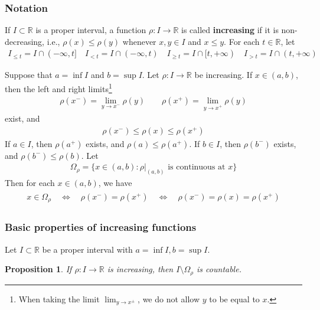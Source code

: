 \documentclass[12pt,b5paper,notitlepage]{article}
\theoremstyle{definition}
\theoremstyle{plain}
\newtheorem{pp}[df]{Proposition}
\newcommand{\Rbb}{\mathbb R}
\numberwithin{equation}{section}
\begin{document}
\subsubsection{Notation}\label{lb89}

If $I\subset\Rbb$ is a proper interval, a function $\rho:I\rightarrow\Rbb$ is called \textbf{increasing} if it is non-decreasing, i.e., $\rho(x)\leq \rho(y)$ whenever $x,y\in I$ and $x\leq y$. For each $t\in\Rbb$, let
\begin{align*}
I_{\leq t}=I\cap (-\infty,t]\quad I_{<t}=I\cap (-\infty,t)\quad I_{\geq t}=I\cap [t,+\infty)\quad I_{>t}=I\cap (t,+\infty)
\end{align*}

Suppose that $a=\inf I$ and $b=\sup I$. Let $\rho:I\rightarrow \Rbb$ be increasing. If $x\in(a,b)$, then the left and right limits\footnote{When taking the limit $\lim_{y\rightarrow x^\pm}$, we do not allow $y$ to be equal to $x$.}
\begin{align}
\rho(x^-)=\lim_{y\rightarrow x^-}\rho(y)\qquad \rho(x^+)=\lim_{y\rightarrow x^+}\rho(y)
\end{align}
exist, and
\begin{align*}
\rho(x^-)\leq \rho(x)\leq \rho(x^+)
\end{align*}
If $a\in I$, then $\rho(a^+)$ exists, and $\rho(a)\leq \rho(a^+)$. If $b\in I$, then $\rho(b^-)$ exists, and $\rho(b^-)\leq \rho(b)$. Let
\begin{align*}
\Omega_\rho=\{x\in (a,b):\rho|_{(a,b)}\text{ is continuous at }x\}
\end{align*}
Then for each $x\in (a,b)$, we have
\begin{gather}\label{eq38}
\begin{gathered}
x\in\Omega_\rho\quad\Leftrightarrow\quad \rho(x^-)=\rho(x^+) \quad\Leftrightarrow\quad \rho(x^-)=\rho(x)=\rho(x^+)
\end{gathered}
\end{gather}


\subsubsection{Basic properties of increasing functions}

Let $I\subset\Rbb$ be a proper interval with $a=\inf I,b=\sup I$.

\begin{pp}\label{lb62}
If $\rho:I\rightarrow\Rbb$ is increasing, then $I\setminus\Omega_\rho$ is countable.
\end{pp}
\end{document}
